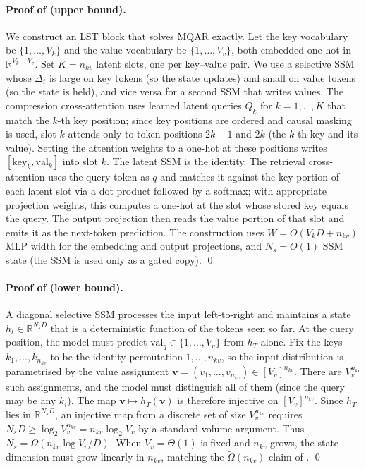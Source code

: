 \documentclass[10pt,twocolumn,letterpaper]{article}
\newcommand{\LST}{\textsc{LST}}
\begin{document}
\paragraph{Proof of  (upper bound).}
We construct an \LST{} block that solves MQAR exactly.  Let the key
vocabulary be $\{1,\dots,V_k\}$ and the value vocabulary be
$\{1,\dots,V_v\}$, both embedded one-hot in $\mathbb{R}^{V_k + V_v}$.
Set $K\!=\!n_{kv}$ latent slots, one per key--value pair.  We use a
selective SSM whose $\Delta_t$ is large on key tokens (so the state
updates) and small on value tokens (so the state is held), and vice
versa for a second SSM that writes values.  The compression
cross-attention uses learned latent queries $Q_k$ for $k\!=\!1,\dots,K$
that match the $k$-th key position; since key positions are ordered and
causal masking is used, slot $k$ attends only to token positions
$2k\!-\!1$ and $2k$ (the $k$-th key and its value).  Setting the
attention weights to a one-hot at these positions writes
$[\mathrm{key}_k, \mathrm{val}_k]$ into slot $k$.  The latent SSM is the
identity.  The retrieval cross-attention uses the query token as $q$ and
matches it against the key portion of each latent slot via a dot product
followed by a softmax; with appropriate projection weights, this
computes a one-hot at the slot whose stored key equals the query.  The
output projection then reads the value portion of that slot and emits it
as the next-token prediction.  The construction uses
$W\!=\!O(V_k D + n_{kv})$ MLP width for the embedding and output
projections, and $N_s\!=\!O(1)$ SSM state (the SSM is used only as a
gated copy).  \qed

\paragraph{Proof of  (lower bound).}
A diagonal selective SSM processes the input left-to-right and maintains
a state $h_t\!\in\!\mathbb{R}^{N_s D}$ that is a deterministic function
of the tokens seen so far.  At the query position, the model must
predict $\mathrm{val}_{q}\!\in\!\{1,\dots,V_v\}$ from $h_T$ alone.  Fix
the keys $k_1,\dots,k_{n_{kv}}$ to be the identity permutation
$1,\dots,n_{kv}$, so the input distribution is parametrised by the value
assignment $\mathbf{v}\!=\!(v_1,\dots,v_{n_{kv}})\!\in\![V_v]^{n_{kv}}$.
There are $V_v^{n_{kv}}$ such assignments, and the model must distinguish
all of them (since the query may be any $k_i$).  The map
$\mathbf{v}\!\mapsto\!h_T(\mathbf{v})$ is therefore injective on
$[V_v]^{n_{kv}}$.  Since $h_T$ lies in $\mathbb{R}^{N_s D}$, an
injective map from a discrete set of size $V_v^{n_{kv}}$ requires
$N_s D\!\geq\!\log_2 V_v^{n_{kv}}\!=\!n_{kv}\log_2 V_v$ by a standard
volume argument.  Thus $N_s\!=\!\Omega(n_{kv}\log V_v / D)$.  When
$V_v\!=\!\Theta(1)$ is fixed and $n_{kv}$ grows, the state dimension
must grow linearly in $n_{kv}$, matching the $\tilde\Omega(n_{kv})$
claim of .  \qed
\end{document}
